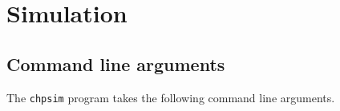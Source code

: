 %
%
%


\chapter{Simulation}\label{chap:simulation}

\section{Command line arguments}\label{sec:cmndline}

The \verb|chpsim| program takes the following command line arguments.

